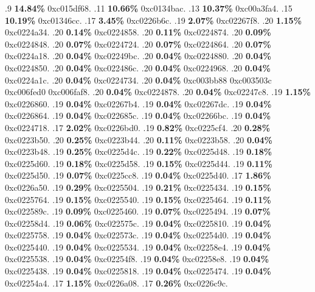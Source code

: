 \begin{profile}
{.9 \textbf{14.84\%} 0xc015df68. 
.11 \textbf{10.66\%} 0xc0134bac. 
.13 \textbf{10.37\%} 0xc00a3fa4. 
.15 \textbf{10.19\%} 0xc01346cc. 
.17 \textbf{3.45\%} 0xc0226b6c. 
.19 \textbf{2.07\%} 0xc02267f8. 
.20 \textbf{1.15\%} 0xc0224a34. 
.20 \textbf{0.14\%} 0xc0224858. 
.20 \textbf{0.11\%} 0xc0224874. 
.20 \textbf{0.09\%} 0xc0224848. 
.20 \textbf{0.07\%} 0xc0224724. 
.20 \textbf{0.07\%} 0xc0224864. 
.20 \textbf{0.07\%} 0xc0224a18. 
.20 \textbf{0.04\%} 0xc02249bc. 
.20 \textbf{0.04\%} 0xc0224880. 
.20 \textbf{0.04\%} 0xc0224850. 
.20 \textbf{0.04\%} 0xc022486c. 
.20 \textbf{0.04\%} 0xc0224968. 
.20 \textbf{0.04\%} 0xc0224a1c. 
.20 \textbf{0.04\%} 0xc0224734. 
.20 \textbf{0.04\%} 0xc003bb88\newline {} 0xc003503c\newline {} 0xc006fed0\newline {} 0xc006faf8. 
.20 \textbf{0.04\%} 0xc0224878. 
.20 \textbf{0.04\%} 0xc02247c8. 
.19 \textbf{1.15\%} 0xc0226860. 
.19 \textbf{0.04\%} 0xc02267b4. 
.19 \textbf{0.04\%} 0xc02267dc. 
.19 \textbf{0.04\%} 0xc0226864. 
.19 \textbf{0.04\%} 0xc022685c. 
.19 \textbf{0.04\%} 0xc02266bc. 
.19 \textbf{0.04\%} 0xc0224718. 
.17 \textbf{2.02\%} 0xc0226bd0. 
.19 \textbf{0.82\%} 0xc0225cf4. 
.20 \textbf{0.28\%} 0xc0223b50. 
.20 \textbf{0.25\%} 0xc0223b44. 
.20 \textbf{0.11\%} 0xc0223b58. 
.20 \textbf{0.04\%} 0xc0223b48. 
.19 \textbf{0.25\%} 0xc0225d4c. 
.19 \textbf{0.22\%} 0xc0225d48. 
.19 \textbf{0.18\%} 0xc0225d60. 
.19 \textbf{0.18\%} 0xc0225d58. 
.19 \textbf{0.15\%} 0xc0225d44. 
.19 \textbf{0.11\%} 0xc0225d50. 
.19 \textbf{0.07\%} 0xc0225cc8. 
.19 \textbf{0.04\%} 0xc0225d40. 
.17 \textbf{1.86\%} 0xc0226a50. 
.19 \textbf{0.29\%} 0xc0225504. 
.19 \textbf{0.21\%} 0xc0225434. 
.19 \textbf{0.15\%} 0xc0225764. 
.19 \textbf{0.15\%} 0xc0225540. 
.19 \textbf{0.15\%} 0xc0225464. 
.19 \textbf{0.11\%} 0xc022589c. 
.19 \textbf{0.09\%} 0xc0225460. 
.19 \textbf{0.07\%} 0xc0225494. 
.19 \textbf{0.07\%} 0xc02258d4. 
.19 \textbf{0.06\%} 0xc022575c. 
.19 \textbf{0.04\%} 0xc0225810. 
.19 \textbf{0.04\%} 0xc0225758. 
.19 \textbf{0.04\%} 0xc022573c. 
.19 \textbf{0.04\%} 0xc02254d0. 
.19 \textbf{0.04\%} 0xc0225440. 
.19 \textbf{0.04\%} 0xc0225534. 
.19 \textbf{0.04\%} 0xc02258e4. 
.19 \textbf{0.04\%} 0xc0225538. 
.19 \textbf{0.04\%} 0xc02254f8. 
.19 \textbf{0.04\%} 0xc02258e8. 
.19 \textbf{0.04\%} 0xc0225438. 
.19 \textbf{0.04\%} 0xc0225818. 
.19 \textbf{0.04\%} 0xc0225474. 
.19 \textbf{0.04\%} 0xc02254a4. 
.17 \textbf{1.15\%} 0xc0226a08. 
.17 \textbf{0.26\%} 0xc0226c9c. 
}
\end{profile}
